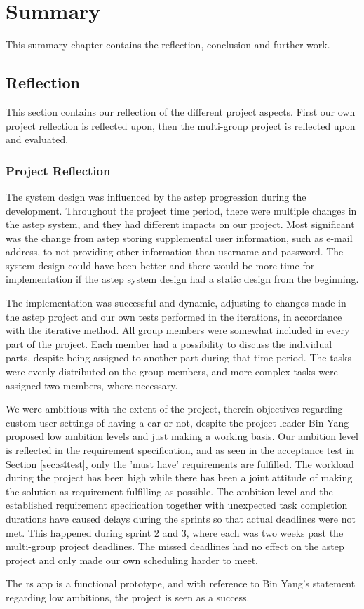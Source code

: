 \chapter{Summary}
This summary chapter contains the reflection, conclusion and further work.

\section{Reflection}
This section contains our reflection of the different project aspects.
First our own project reflection is reflected upon, then the multi-group project is reflected upon and evaluated.

\subsection{Project Reflection}
The system design was influenced by the \gls{astep} progression during the development.
Throughout the project time period, there were multiple changes in the \gls{astep} system, and they had different impacts on our project.
Most significant was the change from \gls{astep} storing supplemental user information, such as e-mail address, to not providing other information than username and password.
The system design could have been better and there would be more time for implementation if the \gls{astep} system design had a static design from the beginning.

The implementation was successful and dynamic, adjusting to changes made in the \gls{astep} project and our own tests performed in the iterations, in accordance with the iterative method.
All group members were somewhat included in every part of the project.
Each member had a possibility to discuss the individual parts, despite being assigned to another part during that time period.
The tasks were evenly distributed on the group members, and more complex tasks were assigned two members, where necessary.

We were ambitious with the extent of the project, therein objectives regarding custom user settings of having a car or not, despite the project leader Bin Yang proposed low ambition levels and just making a working basis.
Our ambition level is reflected in the requirement specification, and as seen in the acceptance test in Section \ref{sec:s4test}, only the 'must have' requirements are fulfilled.
The workload during the project has been high while there has been a joint attitude of making the solution as requirement-fulfilling as possible.
The ambition level and the established requirement specification together with unexpected task completion durations have caused delays during the sprints so that actual deadlines were not met.
This happened during sprint 2 and 3, where each was two weeks past the multi-group project deadlines.
The missed deadlines had no effect on the \gls{astep} project and only made our own scheduling harder to meet.


The \gls{rs} app is a functional prototype, and with reference to Bin Yang's statement regarding low ambitions, the project is seen as a success.


